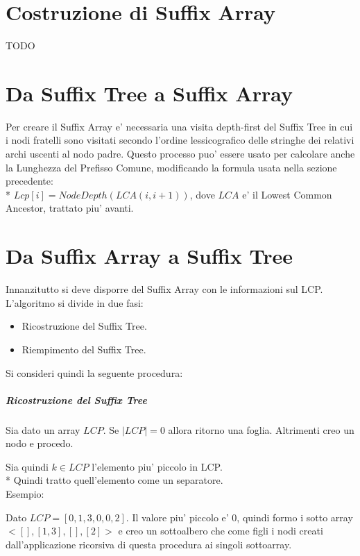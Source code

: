 \section{Costruzione di Suffix Array}

TODO

\section{Da Suffix Tree a Suffix Array}

Per creare il Suffix Array e' necessaria una visita depth-first del Suffix Tree in cui i nodi fratelli sono visitati secondo l'ordine lessicografico delle stringhe dei relativi archi uscenti al nodo padre.
Questo processo puo' essere usato per calcolare anche la Lunghezza del Prefisso Comune, modificando la formula usata nella sezione precedente: \\*
$Lcp[i] = NodeDepth(LCA(i, i+1))$, dove $LCA$ e' il Lowest Common Ancestor, trattato piu' avanti.

\section{Da Suffix Array a Suffix Tree}

Innanzitutto si deve disporre del Suffix Array con le informazioni sul LCP.
L'algoritmo si divide in due fasi: 

\begin{itemize}
\item Ricostruzione del Suffix Tree.
\item Riempimento del Suffix Tree.
\end{itemize}

Si consideri quindi la seguente procedura:

\subparagraph{Ricostruzione del Suffix Tree}

Sia dato un array $LCP$.
Se $|LCP| = 0$ allora ritorno una foglia.
Altrimenti creo un nodo e procedo.

Sia quindi $k \in LCP$ l'elemento piu' piccolo in LCP. \\*
Quindi tratto quell'elemento come un separatore. \\

Esempio:

Dato $LCP = [0, 1, 3, 0, 0, 2]$. Il valore piu' piccolo e' $0$, quindi formo i sotto array $<[], [1,3], [], [2]>$ e creo un sottoalbero che come figli i nodi creati dall'applicazione ricorsiva di questa procedura ai singoli sottoarray.

